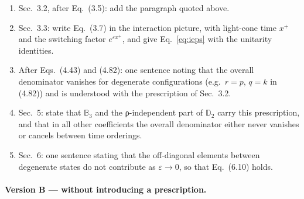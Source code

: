 \documentclass[11pt,a4paper]{article}
\begin{document}
\begin{changes}
\begin{enumerate}[leftmargin=16pt,itemsep=2pt]
\item Sec.~3.2, after Eq.~(3.5): add the paragraph quoted above.
\item Sec.~3.3: write Eq.~(3.7) in the interaction picture, with light-cone time $x^+$ and the switching factor $e^{\varepsilon x^+}$, and give Eq.~\eqref{eq:ieps} with the unitarity identities.
\item After Eqs.~(4.43) and (4.82): one sentence noting that the overall denominator vanishes for degenerate configurations (e.g.\ $r=p$, $q=k$ in (4.82)) and is understood with the prescription of Sec.~3.2.
\item Sec.~5: state that $\mathbb B_3$ and the ρ-independent part of $\mathbb D_2$ carry this prescription, and that in all other coefficients the overall denominator either never vanishes or cancels between time orderings.
\item Sec.~6: one sentence stating that the off-diagonal elements between degenerate states do not contribute as $\varepsilon\to0$, so that Eq.~(6.10) holds.
\end{enumerate}
\end{changes}

\paragraph{Version B --- without introducing a prescription.}
\end{document}

